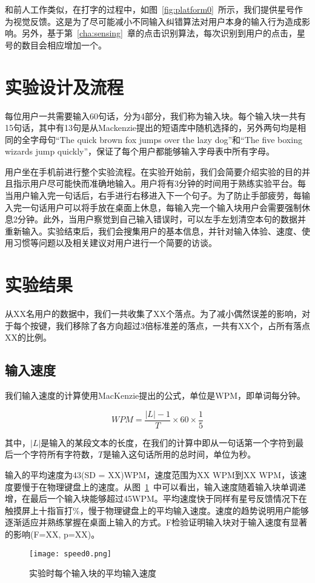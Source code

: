 和前人工作类似\cite{flatglass2011findlater}\cite{2017blindtype}，在打字的过程中，如图~\ref{fig:platform0}~所示，我们提供星号作为视觉反馈。这是为了尽可能减小不同输入纠错算法对用户本身的输入行为造成影响。另外，基于第~\ref{cha:sensing}~章的点击识别算法，每次识别到用户的点击，星号的数目会相应增加一个。


\section{实验设计及流程}
每位用户一共需要输入60句话，分为4部分，我们称为输入块。每个输入块一共有15句话，其中有13句是从Mackenzie提出的短语库\cite{mackenzie2003phrase}中随机选择的，另外两句均是相同的全字母句“The quick brown fox jumps over the lazy dog”和“The five boxing wizards jump quickly”，保证了每个用户都能够输入字母表中所有字母。

用户坐在手机前进行整个实验流程。在实验开始前，我们会简要介绍实验的目的并且指示用户尽可能快而准确地输入。用户将有3分钟的时间用于熟练实验平台。每当用户输入完一句话后，右手进行右移进入下一个句子。为了防止手部疲劳，每输入完一句话用户可以将手放在桌面上休息，每输入完一个输入块用户会需要强制休息2分钟。此外，当用户察觉到自己输入错误时，可以左手左划清空本句的数据并重新输入。实验结束后，我们会搜集用户的基本信息，并针对输入体验、速度、使用习惯等问题以及相关建议对用户进行一个简要的访谈。

\section{实验结果}
从XX名用户的数据中，我们一共收集了XX个落点。为了减小偶然误差的影响，对于每个按键，我们移除了各方向超过3倍标准差的落点，一共有XX个，占所有落点XX的比例。

\subsection{输入速度}
我们输入速度的计算使用MacKenzie提出的公式\cite{speedcalc}，单位是WPM，即单词每分钟。

\begin{equation}
    \label{calcspeed}
    WPM = \frac{|L|-1}{T} \times 60 \times \frac{1}{5}
\end{equation}

其中，$|L|$是输入的某段文本的长度，在我们的计算中即从一句话第一个字符到最后一个字符所有字符数，$T$是输入这句话所用的总时间，单位为秒。

输入的平均速度为43(SD = XX)WPM，速度范围为XX WPM到XX WPM，该速度要慢于在物理键盘上的速度。从图~\ref{fig:speed0}~中可以看出，输入速度随着输入块单调递增，在最后一个输入块能够超过45WPM。平均速度快于同样有星号反馈情况下在触摸屏上十指盲打\%\cite{flatglass2011findlater}，慢于物理键盘上的平均输入速度。速度的趋势说明用户能够逐渐适应并熟练掌握在桌面上输入的方式。F检验证明输入块对于输入速度有显著的影响(F=XX, p=XX)。
\begin{figure}[h] %
    \centering
    \texttt{[image: speed0.png]}
    \caption{实验时每个输入块的平均输入速度}
    \label{fig:speed0}
\end{figure}

